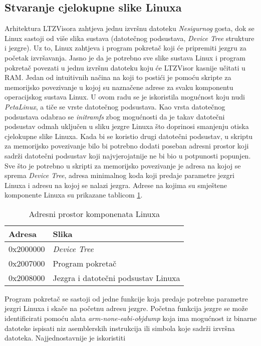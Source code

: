 \documentclass[times, utf8, diplomski, numeric]{fer}
\begin{document}
\subsection{Stvaranje cjelokupne slike Linuxa}
Arhitektura LTZVisora zahtjeva jednu izvršnu datoteku \textit{Nesigurnog} gosta, dok se Linux sastoji od više slika sustava (datotečnog
podsustava, \textit{Device Tree} strukture i jezgre). Uz to, Linux zahtjeva i program pokretač koji će pripremiti jezgru za
početak izvršavanja. Jasno je da je potrebno sve slike sustava Linux i program pokretač povezati u jednu izvršnu datoteku
koju će LTZVisor kasnije učitati u RAM. Jedan od intuitivnih načina na koji to postići je pomoću skripte za memorijsko
povezivanje u kojoj su naznačene adrese za svaku komponentu operacijskog sustava Linux. U ovom radu se je iskoristila mogućnost
koju nudi \textit{PetaLinux}, a tiče se vrste datotečnog podsustava. Kao vrsta datotečnog podsustava odabrao se
\textit{initramfs} zbog mogućnosti da je takav datotečni podsustav odmah uključen u sliku jezgre Linuxa što doprinosi smanjenju
otiska cjelokupne slike Linuxa. Kada bi se koristio drugi datotečni podsustav, u skriptu za memorijsko povezivanje bilo bi
potrebno dodati poseban adresni prostor koji sadrži datotečni podsustav koji najvjerojatnije ne bi bio u potpunosti popunjen.
Sve što je potrebno u skripti za memorijsko povezivanje je adresa na kojoj se sprema \textit{Device Tree}, adresa minimalnog
koda koji predaje parametre jezgri Linuxa i adresu na kojoj se nalazi jezgra. Adrese na kojima su smještene komponente Linuxa
su prikazane tablicom \ref{adr_space}.
\begin{table}[H]
  \centering
  \begin{tabular}{ | p{3cm} | p{6cm} |}
    \hline
    \textbf{Adresa} & \textbf{Slika}\\
    \hline
    0x2000000 & \textit{Device Tree}\\
    \hline
    0x2007000 & Program pokretač\\
    \hline
    0x2008000 & Jezgra i datotečni podsustav  Linuxa\\
    \hline
  \end{tabular}
  \caption{Adresni prostor komponenata Linuxa}
  \label{adr_space}
\end{table}
Program pokretač se sastoji od jedne funkcije koja predaje potrebne parametre jezgri Linuxa i skače na početnu adresu jezgre.
Početna funkcija jezgre se može identificirati pomoću alata \textit{arm-none-eabi-objdump} koja ima mogućnost iz binarne
datoteke ispisati niz asemblerskih instrukcija ili simbola koje sadrži izvršna datoteka. Najjednostavnije je iskoristiti
\end{document}
